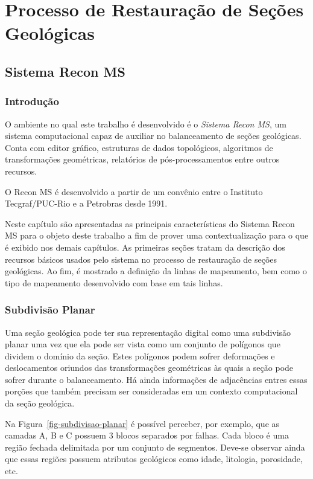 
\chapter{Processo de Restauração de Seções Geológicas}

\section{Sistema Recon MS}

\subsection{Introdução}

O ambiente no qual este trabalho é desenvolvido é o \textit{Sistema Recon MS}, um sistema computacional capaz de auxiliar no balanceamento de seções geológicas. Conta com editor gráfico, estruturas de dados topológicos, algoritmos de transformações geométricas, relatórios de pós-processamentos entre outros recursos.

O Recon MS é desenvolvido a partir de um convênio entre o Instituto Tecgraf/PUC-Rio e a Petrobras desde 1991.

Neste capítulo são apresentadas as principais características do Sistema Recon MS para o objeto deste trabalho a fim de prover uma contextualização para o que é exibido nos demais capítulos. As primeiras seções tratam da descrição dos recursos básicos usados pelo sistema no processo de restauração de seções geológicas. Ao fim, é mostrado a definição da linhas de mapeamento, bem como o tipo de mapeamento desenvolvido com base em tais linhas.

\subsection{Subdivisão Planar} %

Uma seção geológica pode ter sua representação digital como uma subdivisão planar uma vez que ela pode ser vista como um conjunto de polígonos que dividem o domínio da seção. Estes polígonos podem sofrer deformações e deslocamentos oriundos das transformações geométricas às quais a seção pode sofrer durante o balanceamento. Há ainda informações de adjacências entres essas porções que também precisam ser consideradas em um contexto computacional da seção geológica.

Na Figura~\ref{fig-subdivisao-planar} é possível perceber, por exemplo, que as camadas A, B e C possuem 3 blocos separados por falhas. Cada bloco é uma região fechada delimitada por um conjunto de segmentos. Deve-se observar ainda que essas regiões possuem atributos geológicos como idade, litologia, porosidade, etc.

